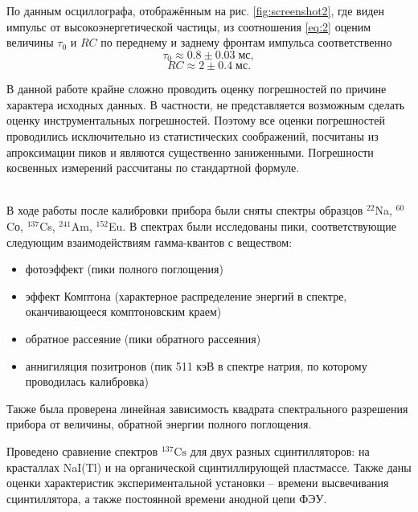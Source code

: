 \documentclass[a4paper]{article}
\newcommand{\isotope}[2]{$ ^{#2}\mathrm{#1} $}
\begin{document}
По данным осциллографа, отображённым на рис. \ref{fig:screenshot2}, где виден импульс от высокоэнергетической частицы, из соотношения \eqref{eq:2} оценим величины $\tau_0$ и $ R C $ по переднему и заднему фронтам импульса соответственно
\[
	\tau_0\approx 0.8 \pm 0.03\; мс,
\]
\[
	R C \approx 2 \pm 0.4 \; мс.
\]

 
В данной работе крайне сложно проводить оценку погрешностей по причине характера исходных данных. В частности, не представляется возможным сделать оценку инструментальных погрешностей. Поэтому все оценки погрешностей проводились исключительно из статистических соображений, посчитаны из апроксимации пиков и являются существенно заниженными. Погрешности косвенных измерений рассчитаны по стандартной формуле.


 ~\\
В ходе работы после калибровки прибора были сняты спектры образцов $^{22}$Na,  $^{60}$Cо,  $^{137}$Cs, $^{241}$Am, $^{152}$Eu. В спектрах были исследованы пики, соответствующие следующим взаимодействиям гамма-квантов с веществом:
\begin{itemize}
	\item фотоэффект (пики полного поглощения)
	\item эффект Комптона (характерное распределение энергий в спектре, оканчивающееся комптоновским краем)
	\item обратное рассеяние (пики обратного рассеяния)
	\item аннигиляция позитронов (пик 511 кэВ в спектре натрия, по которому проводилась калибровка)
\end{itemize}

Также была проверена линейная зависимость квадрата спектрального разрешения прибора от величины, обратной энергии полного поглощения.

Проведено сравнение спектров \isotope{Cs}{137} для двух разных сцинтилляторов: на красталлах NaI(Tl) и на органической сцинтиллирующей пластмассе. Также даны оценки характеристик экспериментальной установки -- времени высвечивания сцинтиллятора, а также постоянной времени анодной цепи ФЭУ.
\end{document}
